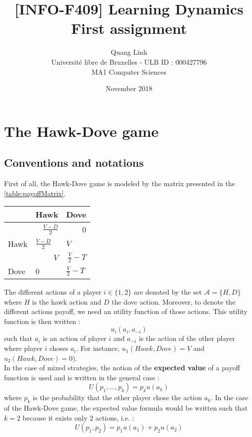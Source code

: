 \documentclass{article}
\title{[INFO-F409] Learning Dynamics \\ First assignment}
\author{\bsc{BUI QUANG PHUONG} Quang Linh \\ Université libre de Bruxelles - ULB ID : 000427796  \\ MA1 Computer Sciences}
\date{November 2018}
\begin{document}
\maketitle

\section{The Hawk-Dove game}

\subsection*{Conventions and notations}
First of all, the Hawk-Dove game is modeled by the matrix presented in the \autoref{table:payoffMatrix}. 

\begin{center}
\begin{tabular}{|l|r|r|}
  \hline
  			   & Hawk & Dove \\
  \hline
  		   & \hspace{1cm} $\frac{V-D}{2}$ & 0 \\
  	Hawk &	\multicolumn{1}{|l|}{$\frac{V-D}{2}$}		& 	\multicolumn{1}{|l|}{$V$ }		\\
  \hline
    		   & \multicolumn{1}{|r|}{$V$} & \hspace{1cm} $\frac{V}{2}-T$  \\
  Dove &	\multicolumn{1}{|l|}{0}		& 	\multicolumn{1}{|l|}{$\frac{V}{2}-T$}		\\
  \hline
\end{tabular}
\label{table:payoffMatrix}
\end{center}

The different actions of a player $i \in \{1,2\}$ are denoted by the set $\mathcal{A} = \{H,D\}$ where $H$ is the hawk action and  
$D$ the dove action. Moreover, to denote the different actions payoff, we need an utility function of those actions. This utility function is then written  : 
$$ u_{i}(a_{i}, a_{-i}) $$ such that $a_{i}$ is an action of player $i$ and $a_{-i}$ is the action of the other player where player $i$ choses $a_{i}$. For instance,  $ u_{1}(Hawk, Dove) = V $ and $ u_{2}(Hawk, Dove) = 0 $). \\

In the case of mixed strategies, the notion of the \textbf{expected value} of a payoff function is used and is written in the general case :
$$ U(p_{1}, ... , p_{k }) = p_{k} u(a_{k})$$ where $p_{k}$ is the probability that the other player chose the action $a_{k}$. 
In the case of the Hawk-Dove game, the expected value formula would be written such that $k=2$ because it exists only 2 actions, i.e. :  $$ U(p_{1}, p_{2}) = p_{1} u(a_{1}) + p_{2} u(a_{2})$$
\end{document}
